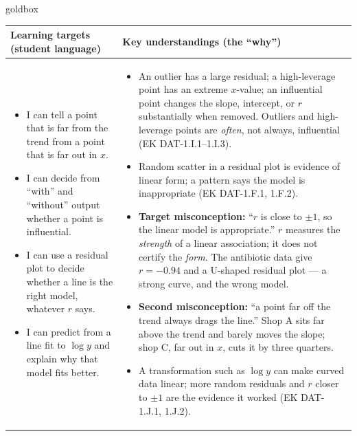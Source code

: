 \documentclass[10pt]{article}
\begin{document}
\renewcommand{\arraystretch}{1.4}
\boxguard
\begin{skillbox}{goldbox}
\begin{tabularx}{\linewidth}{@{}X|X@{}}
\textbf{Learning targets (student language)} & \textbf{Key understandings (the ``why'')} \\[2pt]
\hline
\vspace{-6pt}
\begin{itemize}[leftmargin=1.1em, nosep, after=\vspace{2pt}]
  \item I can tell a point that is far from the trend from a point that is far out in $x$.
  \item I can decide from ``with'' and ``without'' output whether a point is influential.
  \item I can use a residual plot to decide whether a line is the right model, whatever $r$
        says.
  \item I can predict from a line fit to $\log y$ and explain why that model fits better.
\end{itemize}
&
\vspace{-6pt}
\begin{itemize}[leftmargin=1.1em, nosep, after=\vspace{2pt}]
  \item An outlier has a large residual; a high-leverage point has an extreme $x$-value; an
        influential point changes the slope, intercept, or $r$ substantially when removed.
        Outliers and high-leverage points are \emph{often}, not always, influential
        (EK DAT-1.I.1--1.I.3).
  \item Random scatter in a residual plot is evidence of linear form; a pattern says the model
        is inappropriate (EK DAT-1.F.1, 1.F.2).
  \item \textbf{Target misconception:} ``$r$ is close to $\pm1$, so the linear model is
        appropriate.'' $r$ measures the \emph{strength} of a linear association; it does not
        certify the \emph{form}. The antibiotic data give $r = -0.94$ and a U-shaped residual
        plot --- a strong curve, and the wrong model.
  \item \textbf{Second misconception:} ``a point far off the trend always drags the line.''
        Shop A sits far above the trend and barely moves the slope; shop C, far out in $x$,
        cuts it by three quarters.
  \item A transformation such as $\log y$ can make curved data linear; more random residuals
        and $r$ closer to $\pm1$ are the evidence it worked (EK DAT-1.J.1, 1.J.2).
\end{itemize}
\end{tabularx}
\end{skillbox}
\end{document}

